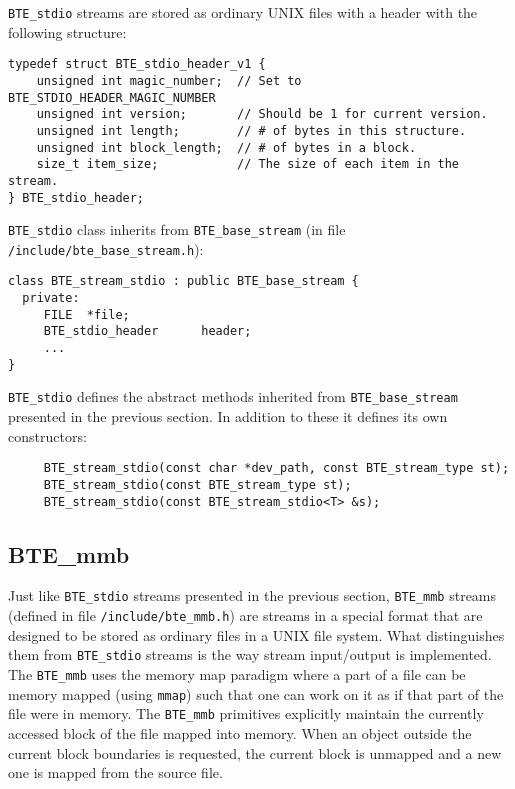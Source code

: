 \verb|BTE_stdio| streams are stored as ordinary UNIX files with a header
with the following structure:

\begin{verbatim}
typedef struct BTE_stdio_header_v1 { 
    unsigned int magic_number;  // Set to BTE_STDIO_HEADER_MAGIC_NUMBER
    unsigned int version;       // Should be 1 for current version.
    unsigned int length;        // # of bytes in this structure.
    unsigned int block_length;  // # of bytes in a block.
    size_t item_size;           // The size of each item in the stream.
} BTE_stdio_header;
\end{verbatim}

\verb|BTE_stdio| class inherits from \verb|BTE_base_stream| (in file
\verb|/include/bte_base_stream.h|):
\begin{verbatim}
class BTE_stream_stdio : public BTE_base_stream {
  private:
     FILE  *file;          
     BTE_stdio_header      header;
     ...
}  
\end{verbatim}

\verb|BTE_stdio| defines the abstract methods inherited from
\verb|BTE_base_stream| presented in the previous section. In addition to these it defines its own
constructors:

\begin{verbatim}
     BTE_stream_stdio(const char *dev_path, const BTE_stream_type st); 
     BTE_stream_stdio(const BTE_stream_type st); 
     BTE_stream_stdio(const BTE_stream_stdio<T> &s);
\end{verbatim}


\subsection{BTE\_mmb}

\tobeextended

Just like \verb|BTE_stdio| streams presented in the previous section,
\verb|BTE_mmb| streams (defined in file \verb|/include/bte_mmb.h|) are
streams in a special format that are designed to be stored as ordinary
files in a UNIX file system. What distinguishes them from \verb|BTE_stdio|
streams is the way stream input/output is implemented. The \verb|BTE_mmb|
uses the memory map paradigm where a part of a file can be memory mapped
(using \verb|mmap|) such that one can work on it as if that part of the
file were in memory. The \verb|BTE_mmb| primitives explicitly maintain the
currently accessed block of the file mapped into memory. When an object
outside the current block boundaries is requested, the current block is
unmapped and a new one is mapped from the source file.

